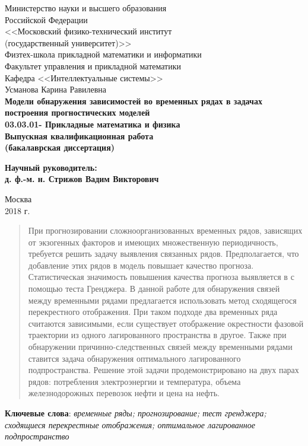 \documentclass[14pt]{article}
\renewcommand{\baselinestretch}{1.5}
\begin{document}

{
\renewcommand{\baselinestretch}{1}
\thispagestyle{empty}
\begin{center}
    \sc
        Министерство науки и высшего образования \\ 
        Российской Федерации\\
        <<Московский физико-технический институт \\
        {(государственный университет)}>>\\
		Физтех-школа прикладной математики и информатики \\        
        Факультет управления и прикладной математики\\
        Кафедра <<Интеллектуальные системы>>\\[35mm]
    \rm\large
        Усманова Карина Равилевна\\[10mm]
    \bf\Large
        Модели обнаружения зависимостей во временных рядах в задачах построения прогностических моделей\\[10mm]
    \rm\normalsize
        03.03.01- Прикладные математика и физика\\[10mm]
    \sc
        Выпускная квалификационная работа\\
        (бакалаврская диссертация)\\[30mm]
\end{center}
\hfill\parbox{80mm}{
    \begin{flushleft}
    \bf
        Научный руководитель:\\
    \rm
    	д. ф.-м. н. Стрижов Вадим Викторович\\[5cm]
    \end{flushleft}
}
\begin{center}
    Москва\\
    2018 г.
\end{center}
}

\newpage
\begin{abstract}
При прогнозировании сложноорганизованных временных рядов, зависящих от экзогенных факторов и имеющих множественную периодичность, требуется решить задачу выявления связанных рядов. 
Предполагается, что добавление этих рядов в модель повышает качество прогноза. 
Статистическая значимость повышения качества прогноза выявляется в с помощью теста Гренджера. 
В данной работе для обнаружения связей между временными рядами предлагается использовать метод сходящегося перекрестного отображения. 
При таком подходе два временных ряда считаются зависимыми, если существует отображение окрестности фазовой траектории из одного лагированного пространства в другое.  
Также при обнаружении причинно-следственных связей между временными рядами ставится задача обнаружения оптимального лагированного подпространства. 
Решение этой задачи продемонстрировано на двух парах рядов: потребления электроэнергии и температура,  объема железнодорожных перевозок нефти и цена на нефть.
\end{abstract}
\textbf{Ключевые слова}: \textit{временные ряды; прогнозирование; тест гренджера; сходящиеся перекрестные отображения; оптимальное лагированное подпространство}
\end{document}
